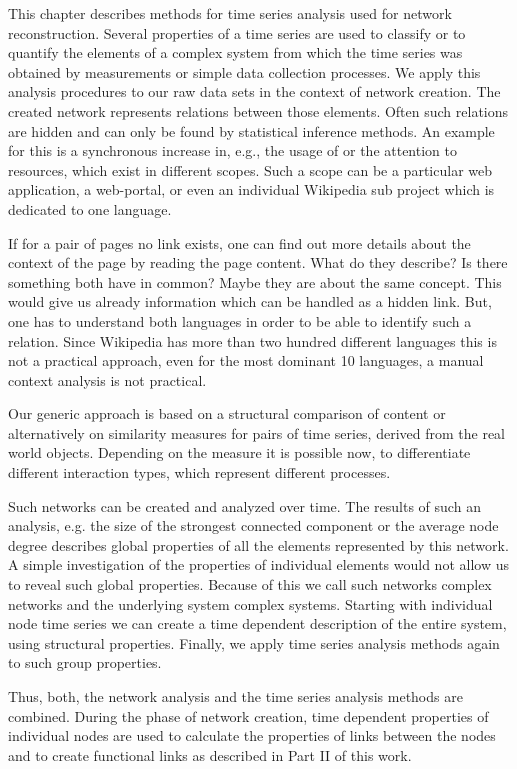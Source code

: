 \documentclass[a4paper,10pt]{scrbook}
\begin{document}
This chapter describes methods for time series analysis used for network reconstruction. Several properties of a time series are used to classify or to quantify the elements of a complex system from which the time series was obtained by measurements or simple data collection processes. We apply this analysis procedures to our raw data sets in the context of network creation. The created network represents relations between those elements. Often such relations are hidden and can only be found by statistical inference methods. An example for this is a synchronous increase in, e.g., the usage of or the attention to resources, which exist in different scopes. Such a scope can be a particular web application, a web-portal, or even an individual Wikipedia sub project which is dedicated to one language. 	

If for a pair of pages no link exists, one can find out more details about the context of the page by reading the page content. What do they describe? Is there something both have in common? Maybe they are about the same concept. This would give us already information which can be handled as a hidden link. But, one has to understand both languages in order to be able to identify such a relation. Since Wikipedia has more than two hundred different languages this is not a practical approach, even for the most dominant 10 languages, a manual context analysis is not practical.

Our generic approach is based on a structural comparison of content or alternatively on similarity measures for pairs of time series, derived from the real world objects. Depending on the measure it is possible now, to differentiate different interaction types, which represent different processes.

Such networks can be created and analyzed over time. The results of such an analysis, e.g. the size of the strongest connected component or the average node degree describes global properties of all the elements represented by this network. A simple investigation of the properties of individual elements would not allow us to reveal such global properties. Because of this we call such networks complex networks and the underlying system complex systems. Starting with individual node time series we can create a time dependent description of the entire system, using structural properties. Finally, we apply time series analysis methods again to such group properties. 

Thus, both, the network analysis and the time series analysis methods are combined. During the phase of network creation, time dependent properties of individual nodes are used to calculate the properties of links between the nodes and to create functional links as described in Part II of this work. 
\end{document}
